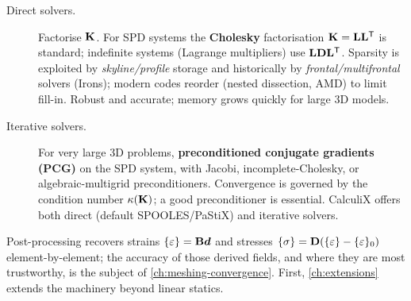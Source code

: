 \begin{description}
  \item[Direct solvers.] Factorise $\mathbf{K}$. For SPD systems the
        \textbf{Cholesky} factorisation $\mathbf{K}=\mathbf{L}\mathbf{L}^{\mathsf{T}}$ is
        standard; indefinite systems (Lagrange multipliers) use
        $\mathbf{L}\mathbf{D}\mathbf{L}^{\mathsf{T}}$. Sparsity is exploited by
        \emph{skyline/profile} storage and historically by
        \emph{frontal/multifrontal} solvers (Irons); modern codes reorder
        (nested dissection, AMD) to limit fill-in. Robust and accurate;
        memory grows quickly for large 3D models.
  \item[Iterative solvers.] For very large 3D problems,
        \textbf{preconditioned conjugate gradients (PCG)} on the SPD
        system, with Jacobi, incomplete-Cholesky, or algebraic-multigrid
        preconditioners. Convergence is governed by the condition number
        $\kappa(\mathbf{K})$; a good preconditioner is essential. CalculiX
        offers both direct (default SPOOLES/PaStiX) and iterative solvers.
\end{description}

Post-processing recovers strains $\{\varepsilon\}=\mathbf{B}\bm{d}$ and stresses
$\{\sigma\}=\mathbf{D}(\{\varepsilon\}-\{\varepsilon\}_0)$ element-by-element; the accuracy of those
derived fields, and where they are most trustworthy, is the subject of
\cref{ch:meshing-convergence}. First, \cref{ch:extensions} extends the
machinery beyond linear statics.
